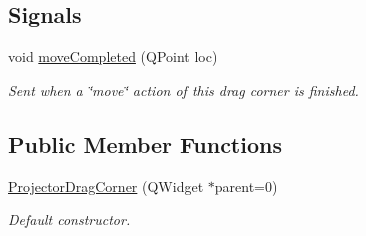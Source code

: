 \subsection*{Signals}
\begin{DoxyCompactItemize}
\item 
void \hyperlink{classProjectorDragCorner_a35f4a1a9e69186e2f881fd0905ff03d1}{move\+Completed} (Q\+Point loc)\hypertarget{classProjectorDragCorner_a35f4a1a9e69186e2f881fd0905ff03d1}{}\label{classProjectorDragCorner_a35f4a1a9e69186e2f881fd0905ff03d1}

\begin{DoxyCompactList}\small\item\em Sent when a \char`\"{}move\char`\"{} action of this drag corner is finished. \end{DoxyCompactList}\end{DoxyCompactItemize}
\subsection*{Public Member Functions}
\begin{DoxyCompactItemize}
\item 
\hyperlink{classProjectorDragCorner_ac0036538a75eed93c518d07c65a4a644}{Projector\+Drag\+Corner} (Q\+Widget $\ast$parent=0)\hypertarget{classProjectorDragCorner_ac0036538a75eed93c518d07c65a4a644}{}\label{classProjectorDragCorner_ac0036538a75eed93c518d07c65a4a644}

\begin{DoxyCompactList}\small\item\em Default constructor. \end{DoxyCompactList}\end{DoxyCompactItemize}
